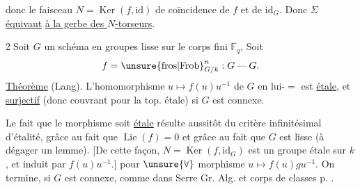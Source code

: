 donc le faisceau $N=\operatorname{Ker}(f,\mathrm{id})$ de coïncidence
de $f$ et de $\mathrm{id}_G$. Donc $\Sigma$ \uline{équivaut}
\uline{à la gerbe des $N$-torseurs}.

\textcircled{2}\quad Soit $G$ un schéma en groupes lisse  sur le
corps fini $\mathbb F_q$,  Soit
\[
f=\unsure{\mathrm{fros}|\mathrm{Frob}}^n_{G/k}:G\mathbin{\text{---}}G.
\]
\uline{Théorème} (Lang). L'homomorphisme $u\mapsto f(u)u^{-1}$ de $G$ en
lui-$=$ est \uline{étale}, et \uline{surjectif} (donc couvrant
pour la top. étale) si $G$ est connexe.

Le fait que le morphisme soit \uline{étale} résulte
aussitôt du critère infinitésimal d'étalité, grâce au fait
que  $\operatorname{Lie}(f)=0$ et grâce au fait que $G$
est lisse (à dégager un lemme). 
[De cette façon, $N=\operatorname{Ker}(f,\mathrm{id}_G)$ est un groupe étale
 sur $k$, et
induit par $f(u)u^{-1}$.]
 pour $\unsure{\forall}$
morphisme $u\mapsto f(u)g u^{-1}$. On termine, si $G$
est connexe, comme dans Serre Gr. Alg. et corps de classes
p. .


